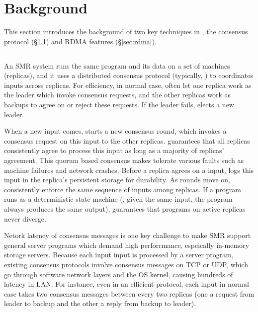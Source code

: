 \section{Background}\label{sec:background}

This section introduces the background of two key techniques in \xxx, the 
\paxos consensus protocol (\S\ref{sec:paxos}) and RDMA features 
(\S\ref{sec:rdma}).

\subsection{\paxos}\label{sec:paxos}
An SMR system runs the same program and its data on a set of machines 
(replicas), and it uses a distributed consensus protocol (typically, \paxos) 
to coordinates inputs across replicas. For efficiency, in normal case, \paxos 
often let one replica work as the leader which invoke consensus requests, and 
the other replicas work as backups to agree on or reject these requests. If 
the leader fails, \paxos elects a new leader.

When a new input comes, \paxos starts a new consensus round, which invokes a 
consensus request on this input to the other replicas. \paxos guarantees that 
all replicas consistently agree to process this input as long as a majority of 
replicas' agreement. This quorum based consensus makes \paxos tolerate various 
faults such as machine failures and network crashes. Before a replica agrees on 
a input, \paxos logs this input in the replica's persistent storage for 
durability. As rounds move on, \paxos consistently enforce the same sequence of 
inputs among replicas. If a program runs as a deterministic state machine (\ie, 
given the same input, the program always produces the same output), \paxos 
guarantees that programs on active replicas never diverge.

Netork latency of consensus messages is one key challenge to make SMR support 
general server programs which demand high perforrmance, espeically in-memory 
storage servers. Because each input input is processed by a server program, 
existing consensus protocols involve consensus messages on TCP or UDP, which go 
through software network layers and the OS kernel, causing hundreds of \us 
latency in LAN. For instance, even in an efficient \paxos protocol, each input 
in normal case takes two consensus messages between every two replicas (one a 
request from leader to backup and the other a reply from backup to leader).


